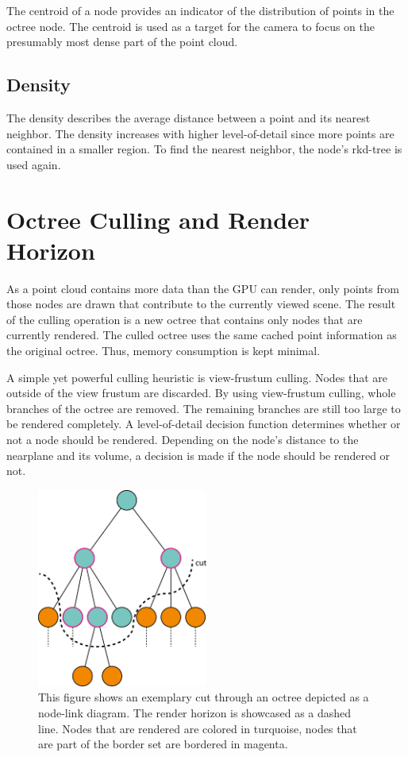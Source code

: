 The centroid of a node provides an indicator of the distribution of points in the octree node. The centroid is used as a target for the camera to focus on the presumably most dense part of the point cloud. 


\subsection{Density}

The density describes the average distance between a point and its nearest neighbor. The density increases with higher level-of-detail since more points are contained in a smaller region. To find the nearest neighbor, the node's rkd-tree is used again.


\section{Octree Culling and Render Horizon}
\label{sec:renderHorizon}

As a point cloud contains more data than the GPU can render, only points from those nodes are drawn that contribute to the currently viewed scene. The result of the culling operation is a new octree that contains only nodes that are currently rendered. The culled octree uses the same cached point information as the original octree. Thus, memory consumption is kept minimal. 

\par

A simple yet powerful culling heuristic is view-frustum culling. Nodes that are outside of the view frustum are discarded. By using view-frustum culling, whole branches of the octree are removed. The remaining branches are still too large to be rendered completely. A level-of-detail decision function determines whether or not a node should be rendered. Depending on the node's distance to the nearplane and its volume, a decision is made if the node should be rendered or not. 

\begin{figure}
    \centering
    \includegraphics[width=0.5\textwidth]{Octree/renderHorizon.png}
    \caption[Illustration of the render horizon of an octree.]
        {This figure shows an exemplary cut through an octree depicted as a node-link diagram. The render horizon is showcased as a dashed line. Nodes that are rendered are colored in turquoise, nodes that are part of the border set are bordered in magenta.}
    \label{fig:renderHorizon}
\end{figure}


